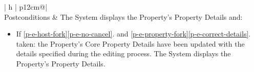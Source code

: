 \begin{table}[H]
\begin{tabular}{| h | p{12cm}@\qquad |}
        \\ \hline
        Postconditions &
        The System displays the Property's Property Details and:
        \begin{itemize}
            \item If \ref{p-e-host-fork}\ref{p-e-no-cancel}. and \ref{p-e-property-fork}\ref{p-e-correct-details}. taken: the Property's Core Property Details have been updated with the details specified during the editing process. The System displays the Property's Property Details.
        \end{itemize}
         \\ \hline
    \end{tabular}
    \caption{Use Case P-E: Edit Property}
    \label{use_case_p-e}
  \end{table}

